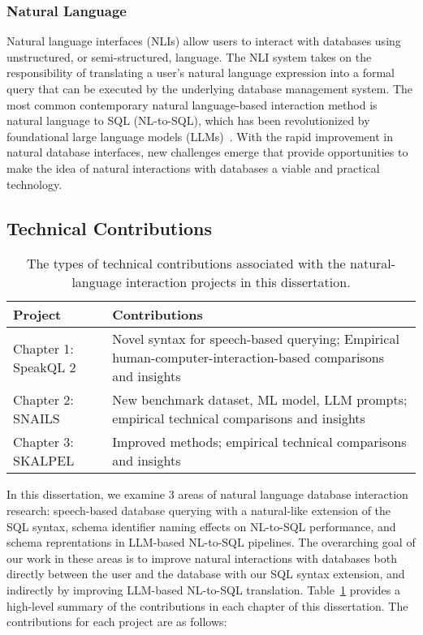 \subsubsection{Natural Language}

Natural language interfaces (NLIs) allow users to interact with databases using unstructured, or semi-structured, language. 
The NLI system takes on the responsibility of translating a user's natural language expression into a formal query that can be executed by the underlying database management system.
The most common contemporary natural language-based interaction method is natural language to SQL (NL-to-SQL), which has been revolutionized by foundational large language models (LLMs)~\cite{openai-chatgpt-blog-post, roziere2023code, anil2023palm}.
With the rapid improvement in natural database interfaces, new challenges emerge that provide opportunities to make the idea of natural interactions with databases a viable and practical technology.


\subsection{Technical Contributions}

\begin{table}[th]
    \centering
    \caption{The types of technical contributions associated with the natural-language interaction projects in this dissertation.}
    \begin{tabular}{p{4cm}p{9cm}}
    \toprule
    \textbf{Project} & \textbf{Contributions} \\
    \midrule
    Chapter 1: SpeakQL 2 & Novel syntax for speech-based querying; Empirical human-computer-interaction-based comparisons and insights\\
    Chapter 2: SNAILS & New benchmark dataset, ML model, LLM prompts; empirical technical comparisons and insights \\
    Chapter 3: SKALPEL & Improved methods; empirical technical comparisons and insights \\
    \bottomrule
    \end{tabular}
    \label{table:contributions}
\end{table}

In this dissertation, we examine 3 areas of natural language database interaction research: speech-based database querying with a natural-like extension of the SQL syntax, schema identifier naming effects on NL-to-SQL performance, and schema reprentations in LLM-based NL-to-SQL pipelines.
The overarching goal of our work in these areas is to improve natural interactions with databases both directly between the user and the database with our SQL syntax extension, and indirectly by improving LLM-based NL-to-SQL translation.
Table~\ref{table:contributions} provides a high-level summary of the contributions in each chapter of this dissertation.
The contributions for each project are as follows:

